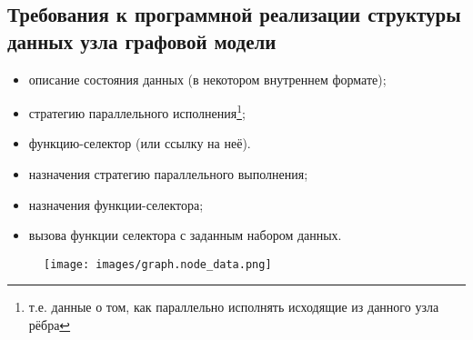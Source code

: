 \subsection{Требования к программной реализации структуры данных узла графовой модели}
\begin{frame}[t]
	\begin{itemize}
		\begin{itemize}
			\item описание состояния данных (в некотором внутреннем формате);
			\item стратегию параллельного исполнения\footnote{т.е. данные о том, как параллельно исполнять исходящие из данного узла рёбра};
			\item функцию-селектор (или ссылку на неё).
		\end{itemize}
		\begin{itemize}
			\item назначения стратегию параллельного выполнения;
			\item назначения функции-селектора;
			\item вызова функции селектора с заданным набором данных.
		\end{itemize}
	\end{itemize}
	\begin{figure}
		\texttt{[image: images/graph.node\_data.png]}
	\end{figure}
\end{frame}

